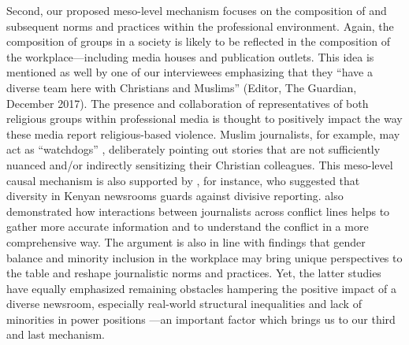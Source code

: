 Second, our proposed meso-level mechanism focuses on the composition of and subsequent norms and practices within the professional environment. Again, the composition of groups in a society is likely to be reflected in the composition of the workplace---including media houses and publication outlets. This idea is mentioned as well by one of our interviewees emphasizing that they ``have a diverse team here with Christians and Muslims'' (Editor, The Guardian, December 2017). The presence and collaboration of representatives of both religious groups within professional media is thought to positively impact the way these media report religious-based violence. Muslim journalists, for example, may act as ``watchdogs'' \citep[see][p. 254]{Nishikawa2009}, deliberately pointing out stories that are not sufficiently nuanced and/or indirectly sensitizing their Christian colleagues. This meso-level causal mechanism is also supported by \cite{Bunce2010}, for instance, who suggested that diversity in Kenyan newsrooms guards against divisive reporting. \cite{Gonen2019} also demonstrated how interactions between journalists across conflict lines helps to gather more accurate information and to understand the conflict in a more comprehensive way. The argument is also in line with findings that gender balance \citep[e.g.,][]{Shor2019} and minority inclusion \citep[e.g.,][]{Johnston2007, Nishikawa2009} in the workplace may bring unique perspectives to the table and reshape journalistic norms and practices. Yet, the latter studies have equally emphasized remaining obstacles hampering the positive impact of a diverse newsroom, especially real-world structural inequalities and lack of minorities in power positions \citep{Johnston2007, Nishikawa2009}---an important factor which brings us to our third and last mechanism. 


